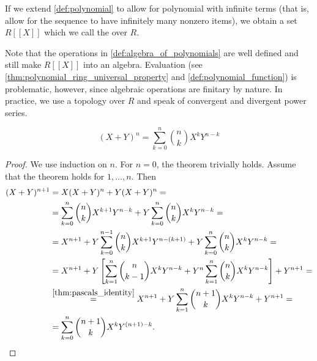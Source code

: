 \begin{definition}\label{def:formal_power_series}
  If we extend \cref{def:polynomial} to allow for polynomial with infinite terms (that is, allow for the sequence to have infinitely many nonzero items), we obtain a set \( R[[X]] \) which we call the  over \( R \).

  Note that the operations in \cref{def:algebra_of_polynomials} are well defined and still make \( R[[X]] \) into an algebra. Evaluation (see \cref{thm:polynomial_ring_universal_property} and \cref{def:polynomial_function}) is problematic, however, since algebraic operations are finitary by nature. In practice, we use a topology over \( R \) and speak of convergent and divergent power series.
\end{definition}

\begin{theorem}\label{thm:binomial_theorem}
  \begin{equation*}
    (X + Y)^n = \sum_{k=0}^n \binom n k X^k Y^{n-k}
  \end{equation*}
\end{theorem}
\begin{proof}
  We use induction on \( n \). For \( n = 0 \), the theorem trivially holds. Assume that the theorem holds for \( 1, \ldots, n \). Then
  \begin{align*}
    (X + Y)^{n+1}
    &=
    X (X + Y)^n + Y (X + Y)^n
    = \\ &=
    \sum_{k=0}^n \binom n k X^{k+1} Y^{n-k} + Y \sum_{k=0}^n \binom n k X^k Y^{n-k}
    = \\ &=
    X^{n+1} + Y \sum_{k=0}^{n-1} \binom n k X^{k+1} Y^{n-(k+1)} + Y \sum_{k=0}^n \binom n k X^k Y^{n-k}
    = \\ &=
    X^{n+1} + Y \left[ \sum_{k=1}^n \binom n {k-1} X^k Y^{n-k} + Y^n \sum_{k=1}^n \binom n k X^k Y^{n-k} \right] + Y^{n+1}
    = \\ &\overset {\ref{thm:pascals_identity}} =
    X^{n+1} + Y \sum_{k=1}^n \binom {n+1} k X^k Y^{n-k} + Y^{n+1}
    = \\ &=
    \sum_{k=0}^n \binom {n+1} k X^k Y^{(n+1)-k}.
  \end{align*}
\end{proof}

